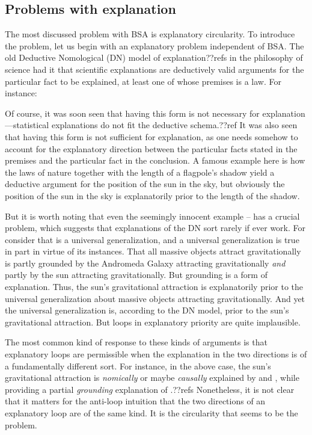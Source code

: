 \subsection{Problems with explanation}\label{sec:law-explanation}
The most discussed problem with BSA is explanatory circularity. To introduce the problem, let us begin with an explanatory 
problem independent of BSA. The old Deductive Nomological (DN) model of explanation??refs in the philosophy of science had it
that scientific explanations are deductively valid arguments for the particular fact to be explained, at least one of whose premises 
is a law. For instance:

Of course, it was soon seen that having this form is not necessary for explanation---statistical explanations do not fit the
deductive schema.??ref It was also seen that having this form is not sufficient for explanation, as one needs somehow to account
for the explanatory direction between the particular facts stated in the premises and the particular fact in the conclusion.
A famous example here is how the laws of nature together with the length of a flagpole's shadow yield a deductive argument
for the position of the sun in the sky, but obviously the position of the sun in the sky is explanatorily prior to the length of
the shadow.

But it is worth noting that even the seemingly innocent example -- has a crucial problem, which suggests that
explanations of the DN sort rarely if ever work. For consider that  is a universal generalization, and a universal
generalization is true in part in virtue of its instances. That all massive objects attract gravitationally is partly grounded
by the Andromeda Galaxy attracting gravitationally \textit{and} partly by the sun attracting gravitationally. But grounding is a 
form of explanation. Thus, the sun's gravitational attraction is explanatorily prior to the universal generalization about massive
objects attracting gravitationally. And yet the universal generalization is, according to the DN model, prior to the sun's gravitational
attraction. But loops in explanatory priority are quite implausible.

The most common kind of response to these kinds of arguments is that explanatory loops are permissible when the explanation in the
two directions is of a fundamentally different sort. For instance, in the above case, the sun's gravitational attraction is 
\textit{nomically} or maybe \textit{causally} explained by  and , while providing a partial \textit{grounding} 
explanation of .??refs Nonetheless, it is not clear that it matters for the anti-loop intuition that the two directions of an 
explanatory loop are of the same kind. It is the circularity that seems to be the problem.

